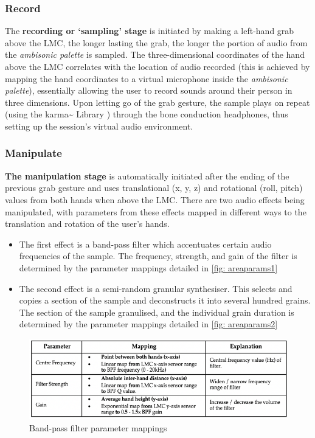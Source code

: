 \subsubsection{Record}                          \label{sec: area-system-software-record}
The \textbf{recording or ‘sampling’ stage} is initiated by making a left-hand grab above the LMC, the longer lasting the grab, the longer the portion of audio from the \textit{ambisonic palette} is sampled. The three-dimensional coordinates of the hand above the LMC correlates with the location of audio recorded (this is achieved by mapping the hand coordinates to a virtual microphone inside the \textit{ambisonic palette}), essentially allowing the user to record sounds around their person in three dimensions. Upon letting go of the grab gesture, the sample plays on repeat (using the karma\textasciitilde{} Library \citep{constanzo2015}) through the bone conduction headphones, thus setting up the session’s virtual audio environment.

\subsubsection{Manipulate}                      \label{sec: area-system-software-manip}
\textbf{The manipulation stage} is automatically initiated after the ending of the previous grab gesture and uses translational (x, y, z) and rotational (roll, pitch) values from both hands when above the LMC. There are two audio effects being manipulated, with parameters from these effects mapped in different ways to the translation and rotation of the user’s hands.
\begin{itemize}
    \item The first effect is a band-pass filter which accentuates certain audio frequencies of the sample. The frequency, strength, and gain of the filter is determined by the parameter mappings detailed in \autoref{fig: areaparams1}
    \item The second effect is a semi-random granular synthesiser. This selects and copies a section of the sample and deconstructs it into several hundred grains. The section of the sample granulised, and the individual grain duration is determined by the parameter mappings detailed in \autoref{fig: areaparams2} 
\end{itemize}
\begin{figure}
    \centering
    \includegraphics[width=0.8\linewidth]{figures/c_5/areatechnical_param1.png}
    \caption{Band-pass filter parameter mappings}
    \label{fig: areaparams1}
\end{figure}

